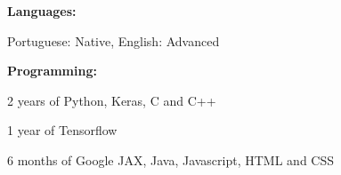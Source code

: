 \textbf{Languages:}


Portuguese: Native, English: Advanced

\textbf{Programming:}


2 years of Python, Keras, C and C++


1 year of Tensorflow


6 months of Google JAX, Java, Javascript, HTML and CSS










